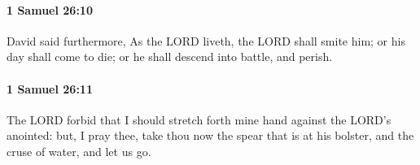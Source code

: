 		\paragraph{1 Samuel 26:10} %
			\label{1SAMUEL-26-10}

			David said furthermore, As the LORD liveth, the LORD shall smite him; or his day shall come to die; or he shall descend into battle, and perish.


		\paragraph{1 Samuel 26:11} %
			\label{1SAMUEL-26-11}

			The LORD forbid that I should stretch forth mine hand against the LORD’s anointed: but, I pray thee, take thou now the spear that is at his bolster, and the cruse of water, and let us go.


